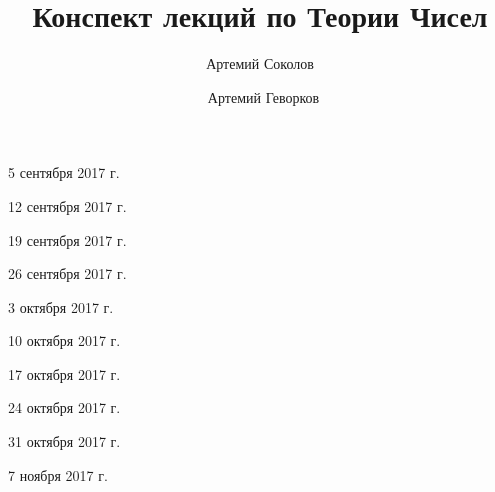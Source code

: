 \documentclass[%
  a4paper,%
  titlepage,%
  11pt%
]{article}%
\title{Конспект лекций по Теории Чисел}
\author{Артемий Соколов \and~Артемий Геворков}
\begin{document}
    
    
    \tableofcontents
    \newpage

    \pagestyle{fancy}

    \renewcommand{\refname}{Дополнительные материалы}


    \begin{lecture}{5 сентября 2017 г.}
        
    \end{lecture}

    \begin{lecture}{12 сентября 2017 г.}
        
    \end{lecture}

    \begin{lecture}{19 сентября 2017 г.}
        
    \end{lecture}

    \begin{lecture}{26 сентября 2017 г.}
        
    \end{lecture}

    \begin{lecture}{3 октября 2017 г.}
        
    \end{lecture}

    \begin{lecture}{10 октября 2017 г.}
        
    \end{lecture}

    \begin{lecture}{17 октября 2017 г.}
        
    \end{lecture}

    \begin{lecture}{24 октября 2017 г.}
        
    \end{lecture}

    \begin{lecture}{31 октября 2017 г.}
        
    \end{lecture}

    \begin{lecture}{7 ноября 2017 г.}
        
    \end{lecture}
\end{document}
